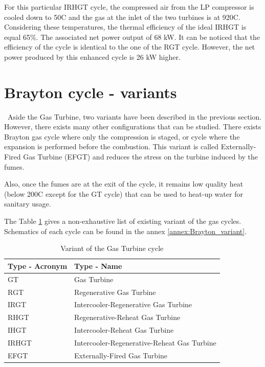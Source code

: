 For this particular IRHGT cycle, the compressed air from the LP compressor is cooled down to 50\degree C and the gas at the inlet of the two turbines is at 920\degree C. Considering these temperatures, the thermal efficiency of the ideal IRHGT is equal 65\%. The associated net power output of 68 kW. It can be noticed that the efficiency of the cycle is identical to the one of the RGT cycle. However, the net power produced by this enhanced cycle is 26 kW higher. 

\section{Brayton cycle - variants}
\quad\ Aside the Gas Turbine, two variants have been described in the previous section. However, there exists many other configurations that can be studied. There exists Brayton gas cycle where only the compression is staged, or cycle where the expansion is performed before the combustion. This variant is called Externally-Fired Gas Turbine (EFGT) and reduces the stress on the turbine induced by the fumes.

Also, once the fumes are at the exit of the cycle, it remains low quality heat (below 200\degree C except for the GT cycle) that can be used to heat-up water for sanitary usage.

The Table \ref{tab:C5_inputconfig} gives a non-exhaustive list of existing variant of the gas cycles. Schematics of each cycle can be found in the  annex \ref{annex:Brayton_variant}.
\begin{longtable}[c]{ll}
\caption{Variant of the Gas Turbine cycle}
\label{tab:C5_inputconfig}\\
\toprule
\textbf{Type - Acronym} & \textbf{Type - Name}                   \\* \midrule
\endfirsthead
%
\endhead
%
\bottomrule
\endfoot
%
\endlastfoot
%
GT                           & Gas Turbine                                 \\
RGT                          & Regenerative Gas Turbine                    \\
IRGT                         & Intercooler-Regenerative Gas Turbine        \\
RHGT                         & Regenerative-Reheat Gas Turbine             \\
IHGT                         & Intercooler-Reheat Gas Turbine              \\
IRHGT                        & Intercooler-Regenerative-Reheat Gas Turbine \\
EFGT                         & Externally-Fired Gas Turbine                \\* \bottomrule
\end{longtable}
